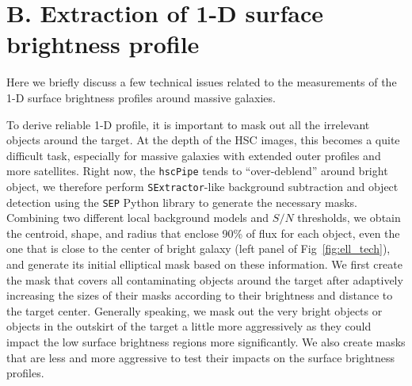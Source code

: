 \documentclass[a4paper,fleqn,usenatbib]{mnras}
\begin{document}
    
\section{B. Extraction of 1-D surface brightness profile} 
    \label{app:ellipse} 
    
    Here we briefly discuss a few technical issues related to the measurements of the 
    1-D surface brightness profiles around massive galaxies. 
    
    To derive reliable 1-D profile, it is important to mask out all the irrelevant 
    objects around the target.
    At the depth of the HSC images, this becomes a quite difficult task, especially 
    for massive galaxies with extended outer profiles and more satellites. 
    Right now, the \texttt{hscPipe} tends to ``over-deblend'' around bright object, 
    we therefore perform \texttt{SExtractor}-like background subtraction and object 
    detection using the \texttt{SEP} Python library to generate the necessary masks.
    Combining two different local background models and $S/N$ thresholds, we obtain 
    the centroid, shape, and radius that enclose 90\% of flux for each object, even 
    the one that is close to the center of bright galaxy (left panel of 
    Fig~\ref{fig:ell_tech}), and generate its initial elliptical mask based on these
    information. 
    We first create the mask that covers all contaminating objects around the target 
    after adaptively increasing the sizes of their masks according to their brightness 
    and distance to the target center. 
    Generally speaking, we mask out the very bright objects or objects in the 
    outskirt of the target a little more aggressively as they could impact the 
    low surface brightness regions more significantly. 
    We also create masks that are less and more aggressive to test their impacts
    on the surface brightness profiles. 
    
\end{document}
